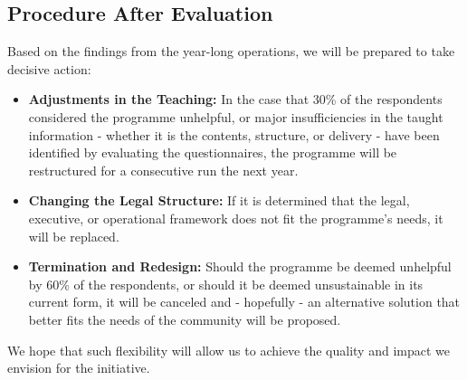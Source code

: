 \subsection{Procedure After Evaluation}
Based on the findings from the year-long operations, we will be prepared to take decisive action:
\begin{itemize}
    \item \textbf{Adjustments in the Teaching:} In the case that 30\% of the respondents considered the programme unhelpful, or major insufficiencies in the taught information - whether it is the contents, structure, or delivery - have been identified by evaluating the questionnaires, the programme will be restructured for a consecutive run the next year.
    \item \textbf{Changing the Legal Structure:} If it is determined that the legal, executive, or operational framework does not fit the programme’s needs, it will be replaced.
    \item \textbf{Termination and Redesign:} Should the programme be deemed unhelpful by 60\% of the respondents, or should it be deemed unsustainable in its current form, it will be canceled and - hopefully - an alternative solution that better fits the needs of the community will be proposed.
\end{itemize}

We hope that such flexibility will allow us to achieve the quality and impact we envision for the initiative.
